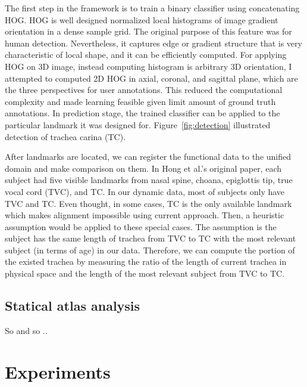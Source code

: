 \documentclass{llncs}
\begin{document}
The first step in the framework is to train a binary classifier using concatenating HOG.
HOG is well designed normalized local histograms of image gradient orientation in a dense sample grid.
The original purpose of this feature was for human detection.
Nevertheless, it captures edge or gradient structure that is very characteristic of local shape, and it can be efficiently computed.
For applying HOG on 3D image, instead computing histogram is arbitrary 3D orientation, I attempted to computed 2D HOG in axial, coronal, and sagittal plane, which are the three perspectives for user annotations.
This reduced the computational complexity and made learning feasible given limit amount of ground truth annotations.
In prediction stage, the trained classifier can be applied to the particular landmark it was designed for.
Figure~\ref{fig:detection} illustrated detection of trachea carina (TC).

After landmarks are located, we can register the functional data to the unified domain and make comparison on them.
In Hong et al.'s original paper, each subject had five visible landmarks from nasal spine, choana, epiglottis tip, true vocal cord (TVC), and TC.
In our dynamic data, most of subjects only have TVC and TC.
Even thought, in some cases, TC is the only available landmark which makes alignment impossible using current approach.
Then, a heuristic assumption would be applied to these special cases.
The assumption is the subject has the same length of trachea from TVC to TC with the most relevant subject (in terms of age) in our data.
Therefore, we can compute the portion of the existed trachea by measuring the ratio of the length of current trachea in physical space and the length of the most relevant subject from TVC to TC.

\subsection{Statical atlas analysis}
\label{sec:statical_atlas_analysis}

So and so ..

\section{Experiments}
\label{sec:experiments}

\end{document}
